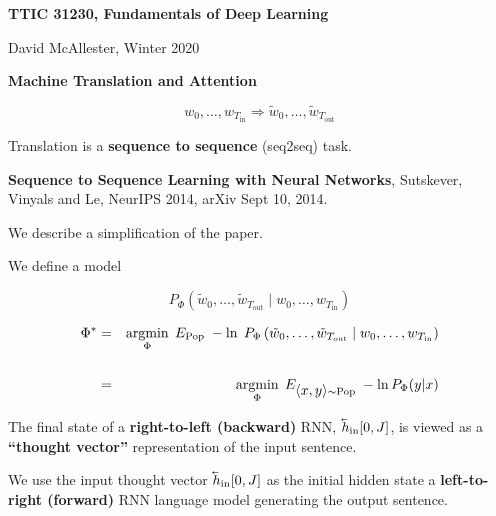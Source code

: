 




{\Huge

  \centerline{\bf TTIC 31230, Fundamentals of Deep Learning}
  \bigskip
  \centerline{David McAllester, Winter 2020}
  \vfill
  \centerline{\bf Machine Translation and Attention}



$$w_0,\ldots,w_{T_{\mathrm{in}}} \Rightarrow \tilde{w}_0,\ldots,\tilde{w}_{T_{\mathrm{out}}}$$

\vfill
Translation is a {\bf sequence to sequence} (seq2seq) task.

\vfill
{\bf Sequence to Sequence Learning with Neural Networks}, Sutskever, Vinyals and Le, NeurIPS 2014, arXiv Sept 10, 2014.

\vfill
We describe a simplification of the paper.




\vfill
We define a model

\vfill
$$P_\Phi\left(\tilde{w}_0,\ldots,\tilde{w}_{T_{\mathrm{out}}}\;|\; w_0,\ldots,w_{T_{\mathrm{in}}}\right)$$

\vfill
\begin{eqnarray*}
\Phi^*  & = & \operatorname*{argmin}_\Phi\; E_{\mathrm{Pop}} \;-\ln\;P_\Phi\left(\tilde{w}_0,\ldots,\tilde{w}_{T_{\mathrm{out}}}\;|\; w_0,\ldots,w_{T_{\mathrm{in}}}\right) \\
\\
& = & \operatorname*{argmin}_\Phi \; E_{{\mbox{$\langle x,y\rangle$}} \sim \mathrm{Pop}} \; -\ln P_\Phi(y|x)
\end{eqnarray*}



\vfill
The final state of a {\bf right-to-left (backward)} RNN, $\cev{h}_{\mathrm{in}}[0,J]$, is viewed as a {\bf ``thought vector''} representation of the input sentence.

\vfill
We use the input thought vector $\cev{h}_{\mathrm{in}}[0,J]$ as the initial hidden state a {\bf left-to-right (forward)} RNN language model
generating the output sentence.

}
